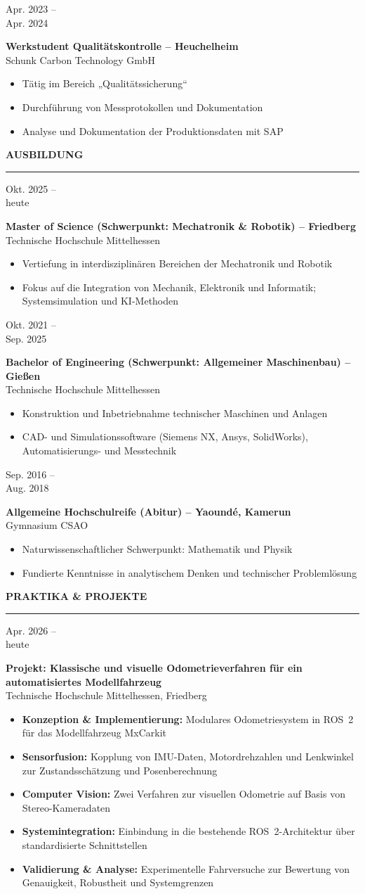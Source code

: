 \documentclass[11pt,a4paper]{article}
\newcommand{\sectionhead}[1]{%
  \vspace{1.1em}
  {\large\bfseries\color{accent}\MakeUppercase{#1}}\\[-0.35em]
  {\color{accent!50}\rule{\linewidth}{0.5pt}}\vspace{0.5em}}
\newcommand{\entry}[4]{%
  \noindent
  \begin{minipage}[t]{2.9cm}\raggedright\small\color{lightgray}#1\end{minipage}%
  \hspace{0.3cm}%
  \begin{minipage}[t]{\dimexpr\linewidth-3.2cm\relax}
    {\normalsize\bfseries\color{black!90}#2}\\[-0.1em]
    {\small\color{accent}#3}
    \begin{itemize}[leftmargin=1.1em,itemsep=0.1em,topsep=0.3em,parsep=0pt,label={\tiny$\bullet$}]
      \small #4
    \end{itemize}
  \end{minipage}\par\vspace{0.55em}}
\begin{document}
\entry{Apr. 2023 --\\ Apr. 2024}
{Werkstudent Qualitätskontrolle -- Heuchelheim}
{Schunk Carbon Technology GmbH}
{\item Tätig im Bereich „Qualitätssicherung“
 \item Durchführung von Messprotokollen und Dokumentation
 \item Analyse und Dokumentation der Produktionsdaten mit SAP}

\sectionhead{Ausbildung}

\entry{Okt. 2025 --\\ heute}
{Master of Science (Schwerpunkt: Mechatronik \& Robotik) -- Friedberg}
{Technische Hochschule Mittelhessen}
{\item Vertiefung in interdisziplinären Bereichen der Mechatronik und Robotik
 \item Fokus auf die Integration von Mechanik, Elektronik und Informatik; Systemsimulation und KI-Methoden}

\entry{Okt. 2021 --\\ Sep. 2025}
{Bachelor of Engineering (Schwerpunkt: Allgemeiner Maschinenbau) -- Gießen}
{Technische Hochschule Mittelhessen}
{\item Konstruktion und Inbetriebnahme technischer Maschinen und Anlagen
 \item CAD- und Simulationssoftware (Siemens NX, Ansys, SolidWorks), Automatisierungs- und Messtechnik}

\entry{Sep. 2016 --\\ Aug. 2018}
{Allgemeine Hochschulreife (Abitur) -- Yaoundé, Kamerun}
{Gymnasium CSAO}
{\item Naturwissenschaftlicher Schwerpunkt: Mathematik und Physik
 \item Fundierte Kenntnisse in analytischem Denken und technischer Problemlösung}

\sectionhead{Praktika \& Projekte}

\entry{Apr. 2026 --\\ heute}
{Projekt: Klassische und visuelle Odometrieverfahren für ein automatisiertes Modellfahrzeug}
{Technische Hochschule Mittelhessen, Friedberg}
{\item \textbf{Konzeption \& Implementierung:} Modulares Odometriesystem in ROS~2 für das Modellfahrzeug MxCarkit
 \item \textbf{Sensorfusion:} Kopplung von IMU-Daten, Motordrehzahlen und Lenkwinkel zur Zustandsschätzung und Posenberechnung
 \item \textbf{Computer Vision:} Zwei Verfahren zur visuellen Odometrie auf Basis von Stereo-Kameradaten
 \item \textbf{Systemintegration:} Einbindung in die bestehende ROS~2-Architektur über standardisierte Schnittstellen
 \item \textbf{Validierung \& Analyse:} Experimentelle Fahrversuche zur Bewertung von Genauigkeit, Robustheit und Systemgrenzen}
\end{document}
